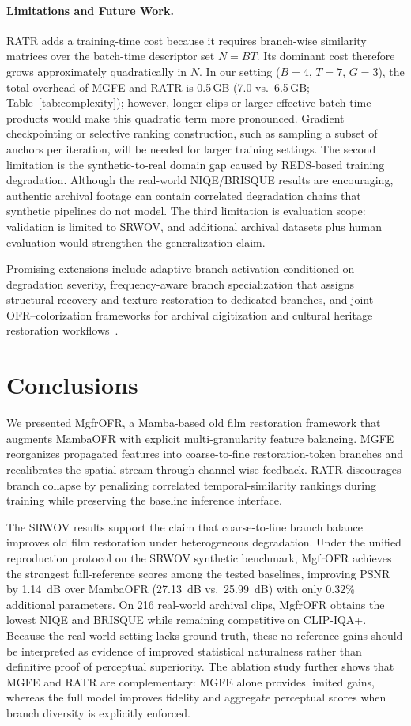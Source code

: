 \documentclass[symmetry,article,submit,pdftex,moreauthors]{Definitions/mdpi}
\begin{document}
\paragraph{Limitations and Future Work.}
RATR adds a training-time cost because it requires branch-wise similarity matrices over the batch-time descriptor set $\bar{N}=BT$. Its dominant cost therefore grows approximately quadratically in $\bar{N}$. In our setting ($B{=}4$, $T{=}7$, $G{=}3$), the total overhead of MGFE and RATR is 0.5\,GB (7.0 vs.\ 6.5\,GB; Table~\ref{tab:complexity}); however, longer clips or larger effective batch-time products would make this quadratic term more pronounced. Gradient checkpointing or selective ranking construction, such as sampling a subset of anchors per iteration, will be needed for larger training settings. The second limitation is the synthetic-to-real domain gap caused by REDS-based training degradation. Although the real-world NIQE/BRISQUE results are encouraging, authentic archival footage can contain correlated degradation chains that synthetic pipelines do not model. The third limitation is evaluation scope: validation is limited to SRWOV, and additional archival datasets plus human evaluation would strengthen the generalization claim.

Promising extensions include adaptive branch activation conditioned on degradation severity, frequency-aware branch specialization that assigns structural recovery and texture restoration to dedicated branches, and joint OFR--colorization frameworks for archival digitization and cultural heritage restoration workflows~\cite{kokaram2004missing}.
\section{Conclusions}
\label{sec:conclusion}

We presented MgfrOFR, a Mamba-based old film restoration framework that augments MambaOFR with explicit multi-granularity feature balancing. MGFE reorganizes propagated features into coarse-to-fine restoration-token branches and recalibrates the spatial stream through channel-wise feedback. RATR discourages branch collapse by penalizing correlated temporal-similarity rankings during training while preserving the baseline inference interface.

The SRWOV results support the claim that coarse-to-fine branch balance improves old film restoration under heterogeneous degradation. Under the unified reproduction protocol on the SRWOV synthetic benchmark, MgfrOFR achieves the strongest full-reference scores among the tested baselines, improving PSNR by 1.14~dB over MambaOFR (27.13~dB vs.\ 25.99~dB) with only 0.32\% additional parameters. On 216 real-world archival clips, MgfrOFR obtains the lowest NIQE and BRISQUE while remaining competitive on CLIP-IQA+. Because the real-world setting lacks ground truth, these no-reference gains should be interpreted as evidence of improved statistical naturalness rather than definitive proof of perceptual superiority. The ablation study further shows that MGFE and RATR are complementary: MGFE alone provides limited gains, whereas the full model improves fidelity and aggregate perceptual scores when branch diversity is explicitly enforced.
\end{document}
